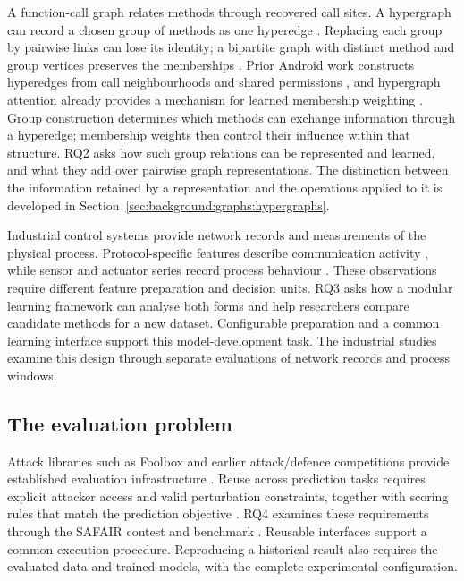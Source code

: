 A function-call graph relates methods through recovered call sites. A hypergraph can record
a chosen group of methods as one hyperedge \cite{zhou2006learning}. Replacing each group by
pairwise links can lose its identity; a bipartite graph with distinct method and group
vertices preserves the memberships \cite{agarwal2006higherorder}. Prior Android work
constructs hyperedges from call neighbourhoods and shared permissions
\cite{zhang2023android}, and hypergraph attention already provides a mechanism for learned
membership weighting \cite{bai2021hypergraphattention}. Group construction determines which
methods can exchange information through a hyperedge; membership weights then control their
influence within that structure. RQ2 asks how such group relations can be represented and
learned, and what they add over pairwise graph representations. The distinction between the information retained
by a representation and the operations applied to it is developed in
Section~\ref{sec:background:graphs:hypergraphs}.

Industrial control systems provide network records and measurements of the physical process.
Protocol-specific features describe communication activity \cite{iuno_ap4}, while sensor and
actuator series record process behaviour \cite{mathur2016swat}. These observations require
different feature preparation and decision units. RQ3 asks how a modular learning framework
can analyse both forms and help researchers compare candidate methods for a new dataset.
Configurable preparation and a common learning interface support this model-development task. The industrial studies
examine this design through separate evaluations of network records and process windows.

\subsection*{The evaluation problem}

Attack libraries such as Foolbox and earlier attack/defence competitions provide established
evaluation infrastructure \cite{rauber2017foolbox,kurakin2018competition}. Reuse across
prediction tasks requires explicit attacker access and valid perturbation constraints,
together with scoring rules that match the prediction objective \cite{carlini2019evaluating}.
RQ4 examines these requirements through the SAFAIR contest and benchmark
\cite{norouzian2021safaircontest,norouzian2021adversarialbenchmark}. Reusable interfaces
support a common execution procedure. Reproducing a historical result also requires the
evaluated data and trained models, with the complete experimental configuration.

